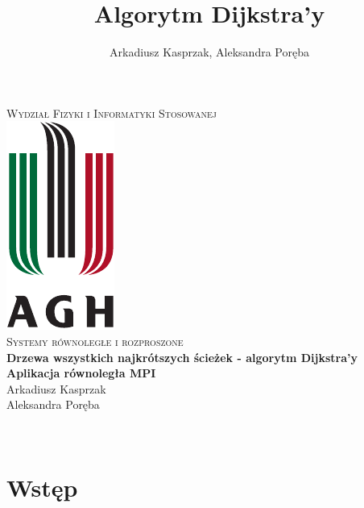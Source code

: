 \documentclass[12pt]{article}
\title{Algorytm Dijkstra'y}
\author{Arkadiusz Kasprzak, Aleksandra Poręba}
\makeatletter
\let\thetitle\@title
\let\theauthor\@author
\makeatother
\begin{document}
\begin{center}
\textsc{\normalsize Wydział Fizyki i Informatyki Stosowanej}\\[2.0cm] 
\includegraphics[scale = 1]{logo.pdf}\\[1cm] 
\textsc{\Large Systemy równoległe i rozproszone}\\[0.4cm] 


{ \huge \bfseries \LARGE{Drzewa wszystkich najkrótszych ścieżek - algorytm Dijkstra'y} }\\[0.2cm] 
{ \huge \bfseries \LARGE{Aplikacja równoległa MPI} }\\[1cm] 

\flushright \Large Arkadiusz Kasprzak \\ Aleksandra Poręba

\vfill 

\center {\today}\\[2cm] 


\pagebreak 

\end{center}

\setcounter{tocdepth}{2}
\tableofcontents
\pagebreak


\pagestyle{fancy}
\fancyhf{}

\rhead{\theauthor}
\lhead{\thetitle}
\cfoot{\thepage}

\section{Wstęp}
\end{document}
